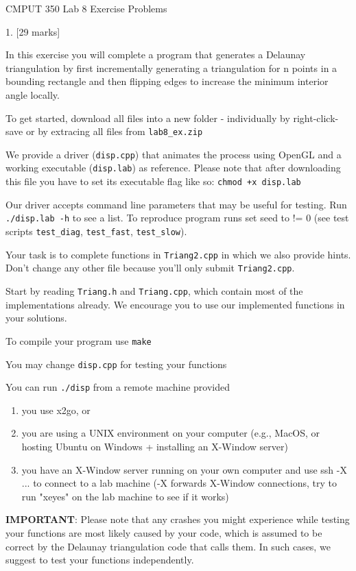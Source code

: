 \documentclass[a4paper,11pt]{article}
\begin{document}

\begin{center}
{\Large CMPUT 350 Lab 8 Exercise Problems}
\end{center}



1. [29 marks]

In this exercise you will complete a program that generates a Delaunay
triangulation by first incrementally generating a triangulation for n points
in a bounding rectangle and then flipping edges to increase the minimum
interior angle locally.

\bigskip

To get started, download all files into a new folder - individually by
right-click-save or by extracing all files from \texttt{lab8\_ex.zip}

\bigskip

We provide a driver (\texttt{disp.cpp}) that animates the process using OpenGL and a
working executable (\texttt{disp.lab}) as reference. Please note that after downloading
this file you have to set its executable flag like so: \texttt{chmod +x disp.lab}

\bigskip

Our driver accepts command line parameters that may be useful for testing. Run
\texttt{./disp.lab -h} to see a list. To reproduce program runs set seed to != 0 (see test
scripts \texttt{test\_diag}, \texttt{test\_fast}, \texttt{test\_slow}).

\bigskip


Your task is to complete functions in \texttt{Triang2.cpp} in which we also provide
hints. Don't change any other file because you'll only submit \texttt{Triang2.cpp}.

\bigskip


Start by reading \texttt{Triang.h} and \texttt{Triang.cpp}, which contain most of the
implementations already. We encourage you to use our implemented functions in
your solutions.

\bigskip


To compile your program use \texttt{make}

You may change \texttt{disp.cpp} for testing your functions

You can run \texttt{./disp} from a remote machine provided 

\begin{enumerate}
    \item you use x2go, or
    \item you are using a UNIX environment on your computer (e.g., MacOS, or hosting
        Ubuntu on Windows + installing an X-Window server)
    \item you have an X-Window server running on your own computer and use ssh -X
    ... to connect to a lab machine (-X forwards X-Window connections, try to
    run "xeyes" on the lab machine to see if it works)
\end{enumerate}

\bigskip

\textbf{IMPORTANT}: Please note that any crashes you might experience while testing
your functions are most likely caused by your code, which is assumed to be
correct by the Delaunay triangulation code that calls them. In such cases, we
suggest to test your functions independently.
\end{document}

